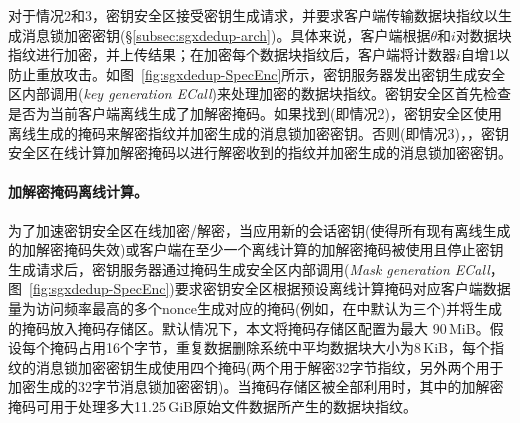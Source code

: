 对于情况2和3，密钥安全区接受密钥生成请求，并要求客户端传输数据块指纹以生成消息锁加密密钥(\S\ref{subsec:sgxdedup-arch})。具体来说，客户端根据$\theta$和$i$对数据块指纹进行加密，并上​​传结果；在加密每个数据块指纹后，客户端将计数器$i$自增1以防止重放攻击。如图~\ref{fig:sgxdedup-SpecEnc}所示，密钥服务器发出密钥生成安全区内部调用(\textit{key generation ECall})来处理加密的数据块指纹。密钥安全区首先检查是否为当前客户端离线生成了加解密掩码。如果找到(即情况2)，密钥安全区使用离线生成的掩码来解密指纹并加密生成的消息锁加密密钥。否则(即情况3)，，密钥安全区在线计算加解密掩码以进行解密收到的指纹并加密生成的消息锁加密密钥。

\paragraph*{加解密掩码离线计算。}为了加速密钥安全区在线加密/解密，当应用新的会话密钥(使得所有现有离线生成的加解密掩码失效)或客户端在至少一个离线计算的加解密掩码被使用且停止密钥生成请求后，密钥服务器通过掩码生成安全区内部调用(\textit{Mask generation ECall}，图~\ref{fig:sgxdedup-SpecEnc})要求密钥安全区根据预设离线计算掩码对应客户端数据量为访问频率最高的多个nonce生成对应的掩码(例如，在\sysnameS 中默认为三个)并将生成的掩码放入掩码存储区。默认情况下，本文将掩码存储区配置为最大 90\,MiB。假设每个掩码占用16个字节，重复数据删除系统中平均数据块大小为8\,KiB，每个指纹的消息锁加密密钥生成使用四个掩码(两个用于解密32字节指纹，另外两个用于加密生成的32字节消息锁加密密钥)。当掩码存储区被全部利用时，其中的加解密掩码可用于处理多大11.25\,GiB原始文件数据所产生的数据块指纹。
